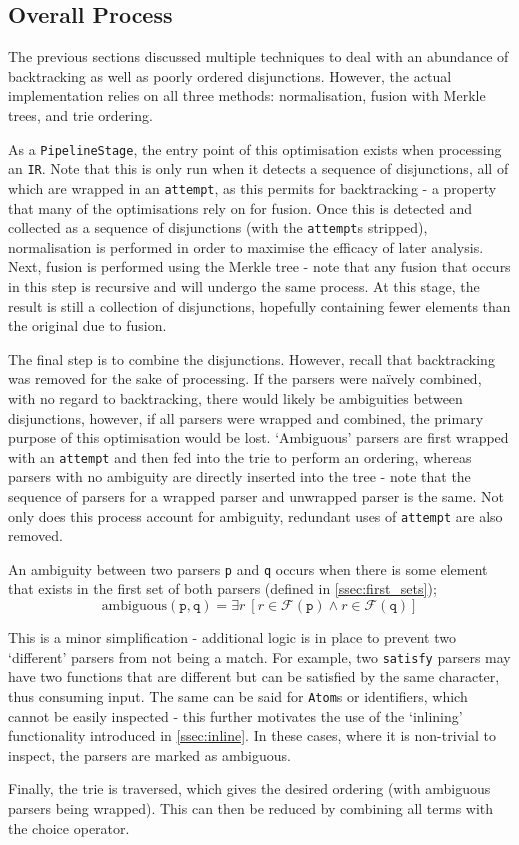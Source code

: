 \subsection{Overall Process}
The previous sections discussed multiple techniques to deal with an abundance of backtracking as well as poorly ordered disjunctions.
However, the actual implementation relies on all three methods: normalisation, fusion with Merkle trees, and trie ordering.

As a \texttt{PipelineStage}, the entry point of this optimisation exists when processing an \texttt{IR}.
Note that this is only run when it detects a sequence of disjunctions, all of which are wrapped in an \texttt{attempt}, as this permits for backtracking - a property that many of the optimisations rely on for fusion.
Once this is detected and collected as a sequence of disjunctions (with the \texttt{attempt}s stripped), normalisation is performed in order to maximise the efficacy of later analysis.
Next, fusion is performed using the Merkle tree - note that any fusion that occurs in this step is recursive and will undergo the same process.
At this stage, the result is still a collection of disjunctions, hopefully containing fewer elements than the original due to fusion.

The final step is to combine the disjunctions.
However, recall that backtracking was removed for the sake of processing.
If the parsers were na\"ively combined, with no regard to backtracking, there would likely be ambiguities between disjunctions, however, if all parsers were wrapped and combined, the primary purpose of this optimisation would be lost.
`Ambiguous' parsers are first wrapped with an \texttt{attempt} and then fed into the trie to perform an ordering, whereas parsers with no ambiguity are directly inserted into the tree - note that the sequence of parsers for a wrapped parser and unwrapped parser is the same.
Not only does this process account for ambiguity, redundant uses of \texttt{attempt} are also removed.

An ambiguity between two parsers \texttt{p} and \texttt{q} occurs when there is some element that exists in the first set of both parsers (defined in \autoref{ssec:first_sets});
$$\text{ambiguous}(\texttt{p}, \texttt{q}) = \exists r\ [r \in \mathcal{F}(\texttt{p}) \land r \in \mathcal{F}(\texttt{q})]$$

This is a minor simplification - additional logic is in place to prevent two `different' parsers from not being a match.
For example, two \texttt{satisfy} parsers may have two functions that are different but can be satisfied by the same character, thus consuming input.
The same can be said for \texttt{Atom}s or identifiers, which cannot be easily inspected - this further motivates the use of the `inlining' functionality introduced in \autoref{ssec:inline}.
In these cases, where it is non-trivial to inspect, the parsers are marked as ambiguous.

Finally, the trie is traversed, which gives the desired ordering (with ambiguous parsers being wrapped).
This can then be reduced by combining all terms with the choice operator.